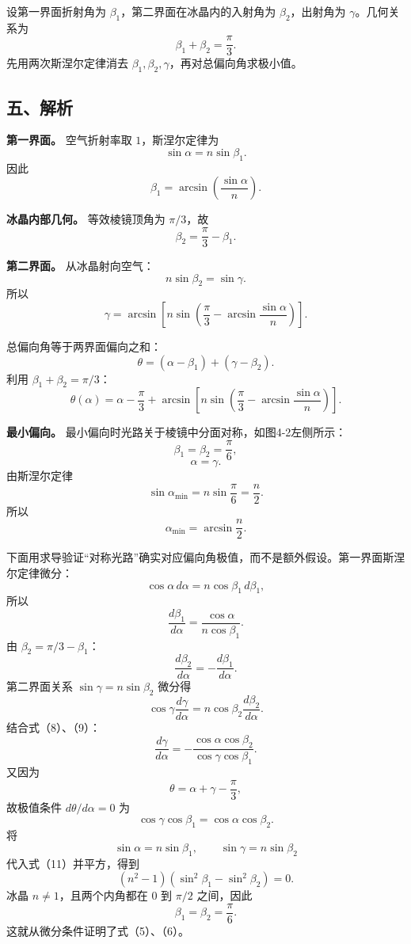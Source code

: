 \documentclass[12pt,a4paper,UTF8]{ctexart}
\begin{document}
设第一界面折射角为 \(\beta_1\)，第二界面在冰晶内的入射角为
\(\beta_2\)，出射角为 \(\gamma\)。几何关系为 \[
\beta_1+\beta_2=\frac\pi3.
\] 先用两次斯涅尔定律消去
\(\beta_1,\beta_2,\gamma\)，再对总偏向角求极小值。

\subsection{五、解析}\label{ux4e94ux89e3ux6790-3}

\textbf{第一界面。} 空气折射率取 \(1\)，斯涅尔定律为 \[
\sin\alpha=n\sin\beta_1.
\] 因此 \[
\beta_1=\arcsin\left(\frac{\sin\alpha}{n}\right). \tag{1}
\]

\textbf{冰晶内部几何。} 等效棱镜顶角为 \(\pi/3\)，故 \[
\beta_2=\frac\pi3-\beta_1. \tag{2}
\]

\textbf{第二界面。} 从冰晶射向空气： \[
n\sin\beta_2=\sin\gamma.
\] 所以 \[
\gamma
=\arcsin\left[
n\sin\left(
\frac\pi3-\arcsin\frac{\sin\alpha}{n}
\right)
\right]. \tag{3}
\]

总偏向角等于两界面偏向之和： \[
\theta=(\alpha-\beta_1)+(\gamma-\beta_2).
\] 利用 \(\beta_1+\beta_2=\pi/3\)： \[
\boxed{
\theta(\alpha)
=\alpha-\frac\pi3
+\arcsin\left[
n\sin\left(
\frac\pi3-\arcsin\frac{\sin\alpha}{n}
\right)
\right]
}. \tag{4}
\]

\textbf{最小偏向。} 最小偏向时光路关于棱镜中分面对称，如图4-2左侧所示：
\[
\beta_1=\beta_2=\frac\pi6, \tag{5}
\] \[
\alpha=\gamma. \tag{6}
\] 由斯涅尔定律 \[
\sin\alpha_{\min}=n\sin\frac\pi6=\frac n2.
\] 所以 \[
\alpha_{\min}=\arcsin\frac n2. \tag{7}
\]

下面用求导验证``对称光路''确实对应偏向角极值，而不是额外假设。第一界面斯涅尔定律微分：
\[
\cos\alpha\,d\alpha
=n\cos\beta_1\,d\beta_1,
\] 所以 \[
\frac{d\beta_1}{d\alpha}
=\frac{\cos\alpha}{n\cos\beta_1}. \tag{8}
\] 由 \(\beta_2=\pi/3-\beta_1\)： \[
\frac{d\beta_2}{d\alpha}
=-\frac{d\beta_1}{d\alpha}. \tag{9}
\] 第二界面关系 \(\sin\gamma=n\sin\beta_2\) 微分得 \[
\cos\gamma\frac{d\gamma}{d\alpha}
=n\cos\beta_2\frac{d\beta_2}{d\alpha}.
\] 结合式（8）、（9）： \[
\frac{d\gamma}{d\alpha}
=-\frac{\cos\alpha\cos\beta_2}
{\cos\gamma\cos\beta_1}. \tag{10}
\] 又因为 \[
\theta=\alpha+\gamma-\frac\pi3,
\] 故极值条件 \(d\theta/d\alpha=0\) 为 \[
\cos\gamma\cos\beta_1
=\cos\alpha\cos\beta_2. \tag{11}
\] 将 \[
\sin\alpha=n\sin\beta_1,
\qquad
\sin\gamma=n\sin\beta_2
\] 代入式（11）并平方，得到 \[
(n^2-1)
\left(
\sin^2\beta_1-\sin^2\beta_2
\right)=0. \tag{12}
\] 冰晶 \(n\ne1\)，且两个内角都在 \(0\) 到 \(\pi/2\) 之间，因此 \[
\beta_1=\beta_2=\frac\pi6.
\] 这就从微分条件证明了式（5）、（6）。
\end{document}
